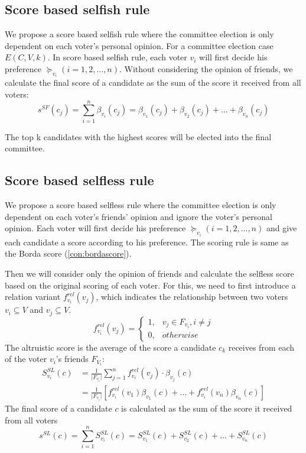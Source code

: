 \documentclass{article}
\begin{document}
\subsection{Score based selfish rule}
We propose a score based selfish rule where the committee election is only dependent on each voter's personal opinion. For a committee election case $E(C,V,k)$. 
In score based selfish rule, each voter $v_i$ will first decide his preference $\succeq_{v_i} (i = 1, 2, \dots , n)$. Without considering the opinion of friends, we calculate the final score of a candidate as the sum of the score it received from all voters:
\begin{equation}
s^{SF}(c_j) = \sum_{i=1}^{n} \beta_{v_i}(c_j)= \beta_{v_1}(c_j) + \beta_{v_2}(c_j) + \dots + \beta_{v_n}(c_j)\label{SB:SF_aggr_voter_Score}
\end{equation}

The top k candidates with the highest scores will be elected into the final committee.

\subsection{Score based selfless rule}
We propose a score based selfless rule where the committee election is only dependent on each voter's friends' opinion and ignore the voter's personal opinion. 
Each voter will first decide his preference $\succeq_{v_i} (i = 1, 2, \dots , n)$ and give each candidate a score according to his preference. The scoring rule is same as the Borda score (\ref{con:bordascore}).

Then we will consider only the opinion of friends and calculate the selfless score based on the original scoring of each voter. For this, we need to first introduce a relation variant $f_{v_i}^{rel}(v_j)$, which indicates the relationship between two voters $v_i\subseteq V$ and $v_j\subseteq V$. 
 \begin{equation}
 f_{v_i}^{rel}(v_j) =\begin{cases}
        1, &v_j \in F_{v_i} ,  i \neq j\\
        0, &otherwise
        \end{cases}\label{re:RL}
\end{equation}
The altruistic score is the average of the score a candidate $c_k$ receives from each of the voter $v_i$'s friends $F_{V_i}$:
\begin{equation}
\begin{split}
S_{v_i}^{SL}(c) &= \frac{1}{\vert F_{v_i}\vert}\sum_{j=1}^{n} f_{v_i}^{rel}(v_j) \cdot \beta_{v_j}(c) \\
            &= \frac{1}{\vert F_{v_i}\vert}[f_{v_i}^{rel}(v_1)\beta_{v_1}(c) + \dots + f_{v_i}^{rel}(v_n)\beta_{v_n}(c)]\label{SB:AL_singlevoter_Score}
\end{split}
\end{equation}
The final score of a candidate $c$ is calculated as the sum of the score it received from all voters
\begin{equation}
s^{SL}(c) = \sum_{i=1}^{n} S_{v_i}^{SL}(c)= S_{v_1}^{SL}(c) + S_{v_2}^{SL}(c) + \dots + S_{v_n}^{SL}(c)\label{SB:AL_aggr_voter_Score}
\end{equation}
\end{document}
